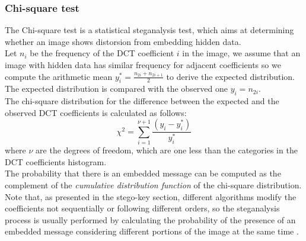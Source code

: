 \documentclass[../../main.tex]{subfiles}
\begin{document}
\subsubsection{Chi-square test}
The Chi-square test is a statistical steganalysis test, which aims
at determining whether an image shows distorsion from embedding hidden data.\\
Let $n_i$ be the frequency of the DCT coefficient $i$ in the
image, we assume that an image with hidden data has similar
frequency for adjacent coefficients so we compute the arithmetic
mean $y_{i}^{*} = \frac{n_{2i}+n_{2i+1}}{2}$ to derive the expected
distribution.\\
The expected distribution is compared with the observed one $y_i = n_{2i}$.\\
The chi-square distribution for the difference between the
expected and the observed DCT coefficients is calculated as follows:
$$ \chi^2 = \sum_{i=1}^{\nu+1}
\frac{\left( y_i-y_{i}^{*}\right)}{y_{i}^{*}}$$
where $\nu$ are the degrees of freedom, which are one less than the categories in the DCT coefficients histogram.\\
The probability that there is an embedded message can be computed
as the complement of the \emph{cumulative distribution function} of
the chi-square distribution.\\

Note that, as presented in the stego-key section, different algorithms
modify the coefficients not sequentially or following different orders, so
the steganalysis process is usually performed by calculating the probability
of the presence of an embedded message considering different portions of the
image at the same time \cite{jpeg-image-internet}.
\end{document}
